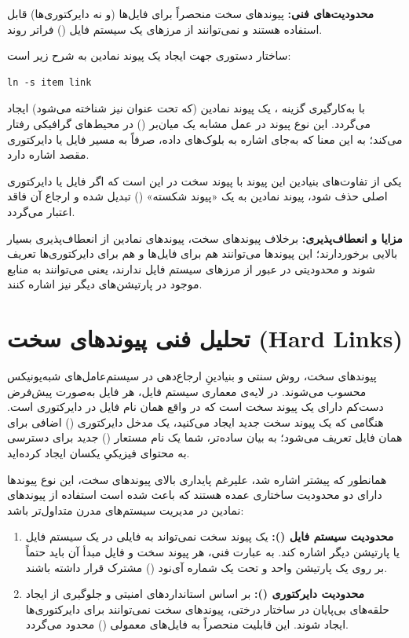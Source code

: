 \textbf{محدودیت‌های فنی:} پیوندهای سخت منحصراً برای فایل‌ها (و نه دایرکتوری‌ها) قابل استفاده هستند و نمی‌توانند از مرزهای یک سیستم‌ فایل () فراتر روند.

ساختار دستوری جهت ایجاد یک پیوند نمادین به شرح زیر است:

\begin{latin}
\begin{lstlisting}
ln -s item link
\end{lstlisting}
\end{latin}

با به‌کارگیری گزینه ، یک پیوند نمادین (که تحت عنوان  نیز شناخته می‌شود) ایجاد می‌گردد. این نوع پیوند در عمل مشابه یک میان‌بر () در محیط‌های گرافیکی رفتار می‌کند؛ به این معنا که به‌جای اشاره به بلوک‌های داده، صرفاً به مسیر فایل یا دایرکتوری مقصد اشاره دارد.

یکی از تفاوت‌های بنیادین این پیوند با پیوند سخت در این است که اگر فایل یا دایرکتوری اصلی حذف شود، پیوند نمادین به یک «پیوند شکسته» () تبدیل شده و ارجاع آن فاقد اعتبار می‌گردد.

\textbf{مزایا و انعطاف‌پذیری:} برخلاف پیوندهای سخت، پیوندهای نمادین از انعطاف‌پذیری بسیار بالایی برخوردارند؛ این پیوندها می‌توانند هم برای فایل‌ها و هم برای دایرکتوری‌ها تعریف شوند و محدودیتی در عبور از مرزهای سیستم‌ فایل ندارند، یعنی می‌توانند به منابع موجود در پارتیشن‌های دیگر نیز اشاره کنند.

\section{تحلیل فنی پیوندهای سخت (Hard Links)}

پیوندهای سخت، روش سنتی و بنیادینِ ارجاع‌دهی در سیستم‌عامل‌های شبه‌یونیکس محسوب می‌شوند. در لایه‌ی معماری سیستم‌ فایل، هر فایل به‌صورت پیش‌فرض دست‌کم دارای یک پیوند سخت است که در واقع همان نام فایل در دایرکتوری است. هنگامی که یک پیوند سخت جدید ایجاد می‌کنید، یک مدخل دایرکتوری () اضافی برای همان فایل تعریف می‌شود؛ به بیان ساده‌تر، شما یک نام مستعار () جدید برای دسترسی به محتوای فیزیکیِ یکسان ایجاد کرده‌اید.

همانطور که پیشتر اشاره شد، علیرغم پایداری بالای پیوندهای سخت، این نوع پیوندها دارای دو محدودیت ساختاری عمده هستند که باعث شده است استفاده از پیوندهای نمادین در مدیریت سیستم‌های مدرن متداول‌تر باشد:

\begin{enumerate}
  \item \textbf{محدودیت سیستم‌ فایل ():} یک پیوند سخت نمی‌تواند به فایلی در یک سیستم‌ فایل یا پارتیشن دیگر اشاره کند. به عبارت فنی، هر پیوند سخت و فایل مبدأ آن باید حتماً بر روی یک پارتیشن واحد و تحت یک شماره آی‌نود () مشترک قرار داشته باشند.

  \item \textbf{محدودیت دایرکتوری ():} بر اساس استانداردهای امنیتی و جلوگیری از ایجاد حلقه‌های بی‌پایان در ساختار درختی، پیوندهای سخت نمی‌توانند برای دایرکتوری‌ها ایجاد شوند. این قابلیت منحصراً به فایل‌های معمولی () محدود می‌گردد.
\end{enumerate}

